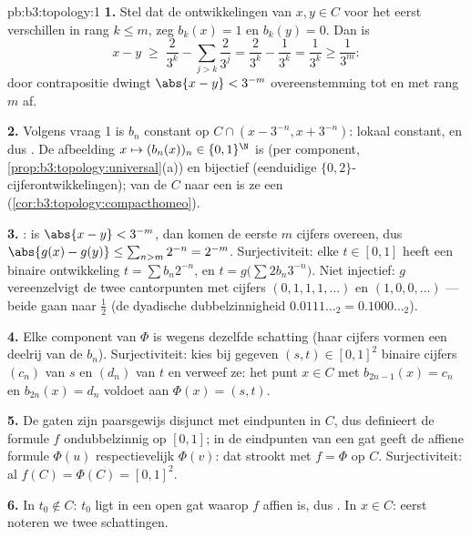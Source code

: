 \begin{solution}{pb:b3:topology:1}
\textbf{1.} Stel dat de ontwikkelingen van $x, y \in C$ voor het
eerst verschillen in rang $k \leq m$, zeg $b_k(x) = 1$ en $b_k(y)
= 0$. Dan is
\[
x - y \;\geq\; \frac{2}{3^k} - \sum_{j > k}\frac{2}{3^j}
= \frac{2}{3^k} - \frac{1}{3^k} = \frac1{3^k} \geq \frac1{3^m}:
\]
door contrapositie dwingt $\abs{x - y} < 3^{-m}$ overeenstemming
tot en met rang $m$ af.

\textbf{2.} Volgens vraag 1 is $b_n$ constant op $C \cap (x -
3^{-n}, x + 3^{-n})$: lokaal constant, en dus . De
afbeelding $x \mapsto (b_n(x))_n \in \{0,1\}^\N$ is  (per
component, \cref{prop:b3:topology:universal}(a)) en bijectief
(eenduidige $\{0,2\}$-cijferontwikkelingen); van de  $C$
naar een  is ze een 
(\cref{cor:b3:topology:compacthomeo}).

\textbf{3.} : is $\abs{x - y} < 3^{-m}$, dan komen de
eerste $m$ cijfers overeen, dus $\abs{g(x) - g(y)} \leq \sum_{n >
m}2^{-n} = 2^{-m}$. Surjectiviteit: elke $t \in [0,1]$ heeft een
binaire ontwikkeling $t = \sum b_n2^{-n}$, en $t = g\bigl(\sum
2b_n3^{-n}\bigr)$. Niet injectief: $g$ vereenzelvigt de twee
cantorpunten met cijfers $(0,1,1,1,\dots)$ en $(1,0,0,\dots)$ ---
beide gaan naar $\frac12$ (de dyadische dubbelzinnigheid
$0.0111\ldots_2 = 0.1000\ldots_2$).

\textbf{4.} Elke component van $\Phi$ is  wegens dezelfde
schatting (haar cijfers vormen een deelrij van de $b_n$).
Surjectiviteit: kies bij gegeven $(s, t) \in [0,1]^2$ binaire
cijfers $(c_n)$ van $s$ en $(d_n)$ van $t$ en verweef ze: het punt
$x \in C$ met $b_{2n-1}(x) = c_n$ en $b_{2n}(x) = d_n$ voldoet aan
$\Phi(x) = (s,t)$.

\textbf{5.} De gaten zijn paarsgewijs disjunct met eindpunten in
$C$, dus definieert de formule $f$ ondubbelzinnig op $[0,1]$; in
de eindpunten van een gat geeft de affiene formule $\Phi(u)$
respectievelijk $\Phi(v)$: dat strookt met $f = \Phi$ op $C$.
Surjectiviteit: al $f(C) = \Phi(C) = [0,1]^2$.

\textbf{6.} In $t_0 \notin C$: $t_0$ ligt in een open gat waarop
$f$ affien is, dus . In $x \in C$: eerst noteren we twee
schattingen.


\end{solution}
